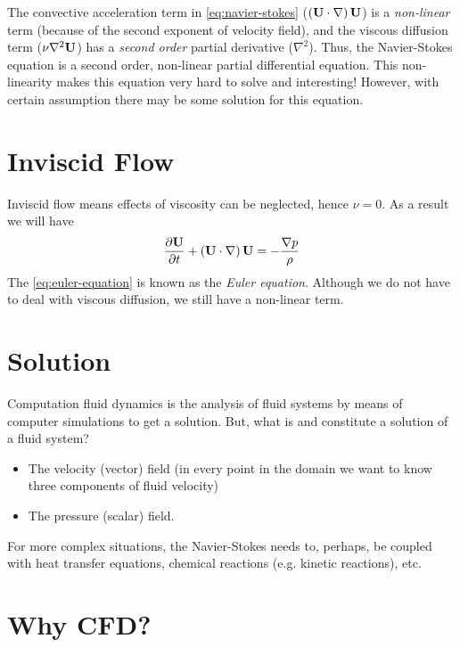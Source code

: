 The convective acceleration term in \cref{eq:navier-stokes} (\(\left(\mathbf{U} \cdot \nabla\right) \mathbf{U}\)) is a \emph{non-linear} term (because of the second exponent of velocity field), and the viscous diffusion term (\(\nu \nabla^2 \mathbf{U}\)) has a \emph{second order} partial derivative (\(\nabla^2\)). Thus, the Navier-Stokes equation is a second order, non-linear partial differential equation. This non-linearity makes this equation very hard to solve and interesting! However, with certain assumption there may be some solution for this equation.

\section{Inviscid Flow}

Inviscid flow means effects of viscosity can be neglected, hence \(\nu = 0\). As a result we will have
%
\begin{equation}
  \frac{\partial \mathbf{U}}{\partial t} + \left( \mathbf{U} \cdot \nabla \right) \mathbf{U} = -\frac{\nabla{p}}{\rho}
  \label{eq:euler-equation}
\end{equation}
%
The \cref{eq:euler-equation} is known as the \emph{Euler equation}.
Although we do not have to deal with viscous diffusion, we still have a non-linear term.


\section{Solution}

Computation fluid dynamics is the analysis of fluid systems by means of computer simulations to get a solution.
But, what is and constitute a solution of a fluid system?
%
\begin{itemize}
  \item The velocity (vector) field (in every point in the domain we want to know three components of fluid velocity)
  \item The pressure (scalar) field.
\end{itemize}
%
For more complex situations, the Navier-Stokes needs to, perhaps, be coupled with heat transfer equations, chemical reactions (e.g. kinetic reactions), etc.


\section{Why CFD?}

